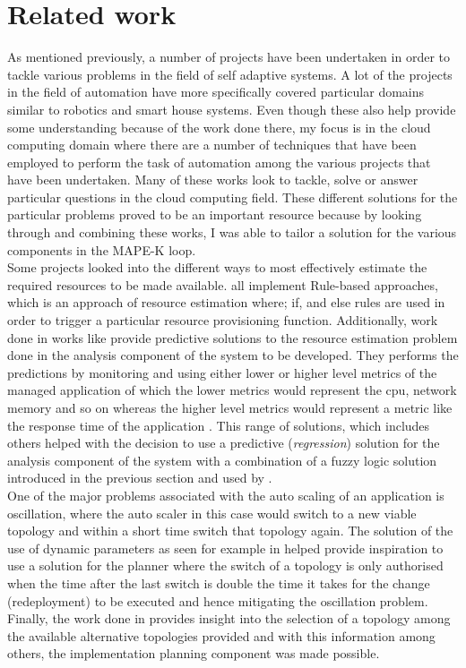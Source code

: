 \section{Related work}
As mentioned previously, a number of projects have been undertaken in order to tackle various problems in the field of self adaptive systems. A lot of the projects in the field of automation have more specifically covered particular domains similar to robotics and smart house systems. Even though these also help provide some understanding because of the work done there, my focus is in the cloud computing domain where there are a number of techniques that have been employed to perform the task of automation among the various projects that have been undertaken. Many of these works look to tackle, solve or answer particular questions in the cloud computing field. These different solutions for the particular problems proved to be an important resource because by looking through and combining these works, I was able to tailor a solution for the various components in the MAPE-K loop.
\\Some projects looked into the different ways to most effectively estimate the required resources to be made available.  \cite{amazon, dawoud2012elastic, al2013impact} all implement Rule-based approaches, which is an approach of resource estimation where; if, and else rules are used in order to trigger a particular resource provisioning function. Additionally, work done in works like \cite{yazdanov2012vertical, ghobaei2018autonomic, fang2012rpps}  provide predictive solutions to the resource estimation problem done in the analysis component of the system to be developed. They performs the predictions by monitoring and using either lower or higher level metrics of the managed application of which the lower metrics would represent the cpu, network memory and so on whereas the higher level metrics would represent a metric like the response time of the application \cite{qu2018auto}. This range of solutions, which includes others helped with the decision to use a predictive (\textit{regression}) solution for the analysis component of the system with a combination of a fuzzy logic solution introduced in the previous section and used by \cite{frey2014cloud}.
\\One of the major problems associated with the auto scaling of an application is oscillation, where the auto scaler in this case would switch to a new viable topology and within a short time switch that topology again\cite{qu2018auto}. The solution of the use of dynamic parameters as seen for example in \cite{lim2010automated} helped provide inspiration to use a solution for the planner where the switch of a topology is only authorised when the time after the last switch is double the time it takes for the change (redeployment) to be executed and hence mitigating the oscillation problem.  Finally, the work done in \cite{andrikopoulos2014optimal} provides insight into the selection of a topology among the available alternative topologies provided and with this information among others, the implementation planning component was made possible.
